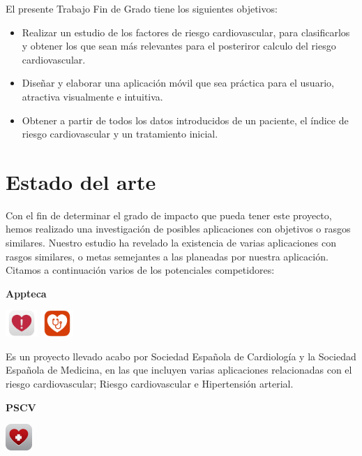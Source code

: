 \documentclass[11pt,spanish,
		listoftables,listoffigures]
		{tfgplantilla}
\begin{document}
El presente Trabajo Fin de Grado tiene los siguientes objetivos:
\begin{itemize}
	\item Realizar un estudio de los factores de riesgo cardiovascular, para clasificarlos y obtener los que sean más relevantes para el posteriror calculo del riesgo cardiovascular.
	\item Diseñar y elaborar una aplicación móvil que sea práctica para el usuario, atractiva visualmente e intuitiva.
	\item Obtener a partir de todos los datos introducidos de un paciente, el índice de riesgo cardiovascular y un tratamiento inicial.
\end{itemize}

\section{Estado del arte}

Con el fin de determinar el grado de impacto que pueda tener este proyecto, hemos realizado una investigación de posibles aplicaciones con objetivos o rasgos similares. Nuestro estudio ha revelado la existencia de varias aplicaciones con rasgos similares, o metas semejantes a las planeadas por nuestra aplicación. Citamos a continuación varios de los potenciales competidores:

\noindent
\textbf {Appteca }

\noindent
\includegraphics[height=1cm]{riesgo-cardiovascular_icon.jpg}  
\includegraphics[height=1cm]{hipertension_icon.jpg}

\noindent
Es un  proyecto llevado acabo por Sociedad Española de Cardiología y la Sociedad Española de Medicina, en las que incluyen varias aplicaciones relacionadas con el riesgo cardiovascular; Riesgo cardiovascular e Hipertensión arterial.

\noindent
\textbf {PSCV}

\noindent
\includegraphics[height=1cm]{PSCV_icon.jpg}
\end{document}
